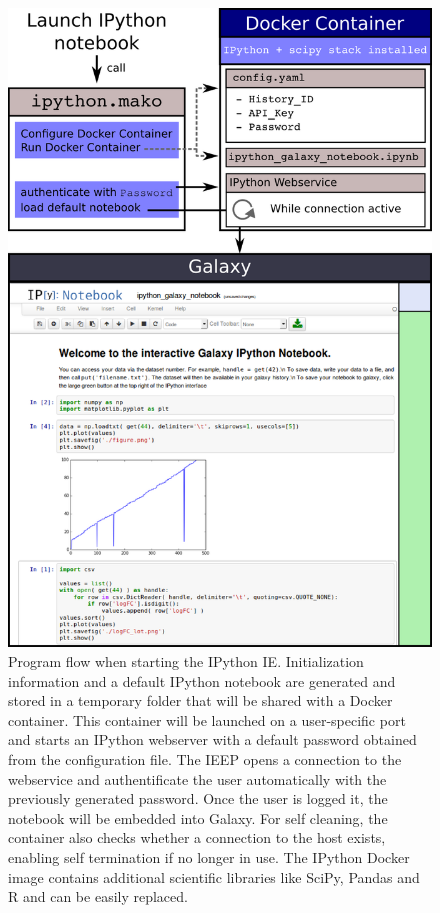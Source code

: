 \documentclass{bioinfo}
\begin{document}
\begin{methods}
\begin{figure}[!tpb]
    \centerline{\includegraphics[width=.48\textwidth]{diagram.png}}
\caption{Program flow when starting the IPython IE.
Initialization information and a default IPython notebook are generated and stored in a temporary folder that will be shared
with a Docker container. This container will be launched on a user-specific port and starts an IPython webserver
with a default password obtained from the configuration file. 
The IEEP opens a connection to the webservice and authentificate the user automatically with the previously generated password.
Once the user is logged it, the notebook will be embedded into Galaxy.
For self cleaning, the container also checks whether a connection to the host exists, enabling self termination 
if no longer in use. The IPython Docker image contains additional scientific libraries like SciPy, 
Pandas and R and can be easily replaced.
}
\label{fig:diagram}
\end{figure}


\end{methods}
\end{document}

